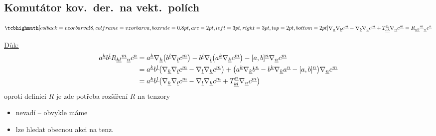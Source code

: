 \subsection*{Komutátor kov.\ der.\ na vekt.\ polích}
\begin{veta}
\[
  \vzorec{\nabla_{\gmIjedenactAu{a}}\nabla_{\gmIjedenactAu{b}}c^{\gmIjedenactAu{m}} - \nabla_{\gmIjedenactAu{b}}\nabla_{\gmIjedenactAu{a}}c^{\gmIjedenactAu{m}}
  + T^{\gmIjedenactAu{n}}_{\gmIjedenactAu{ab}}\nabla_{\gmIjedenactAu{n}}c^{\gmIjedenactAu{m}}
  = R_{\gmIjedenactAu{ab}}{}^{\gmIjedenactAu{m}}{}_{\gmIjedenactAu{n}}c^{\gmIjedenactAu{n}}}
\]
\end{veta}
\underline{Důk:}
\begin{align*}
  a^{\underline{k}}b^{\underline{l}}R_{\underline{kl}}{}^{\underline{m}}{}_{\underline{n}}c^{\underline{n}}
  &= a^{\underline{k}}\nabla_{\underline{k}}\big(b^{\underline{l}}\nabla_{\underline{l}}c^{\underline{m}}\big)
   - b^{\underline{l}}\nabla_{\underline{l}}\big(a^{\underline{k}}\nabla_{\underline{k}}c^{\underline{m}}\big)
   - [a,b]^{\underline{n}}\nabla_{\underline{n}}c^{\underline{m}} \\
  &= a^{\underline{k}}b^{\underline{l}}\big(\nabla_{\underline{k}}\nabla_{\underline{l}}c^{\underline{m}} - \nabla_{\underline{l}}\nabla_{\underline{k}}c^{\underline{m}}\big)
   + \big(a^{\underline{k}}\nabla_{\underline{k}}b^{\underline{n}} - b^{\underline{k}}\nabla_{\underline{k}}a^{\underline{n}} - [a,b]^{\underline{n}}\big)\nabla_{\underline{n}}c^{\underline{m}} \\
  &= a^{\underline{k}}b^{\underline{l}}\big(\nabla_{\underline{k}}\nabla_{\underline{l}}c^{\underline{m}} - \nabla_{\underline{l}}\nabla_{\underline{k}}c^{\underline{m}}
   + T^{\underline{n}}_{\underline{kl}}\nabla_{\underline{n}}c^{\underline{m}}\big)
\end{align*}
oproti definici $R$ je zde potřeba rozšíření $R$ na tenzory
\begin{itemize}[nosep]
  \item[--] nevadí -- obvykle máme
  \item[--] lze hledat obecnou akci na tenz.
\end{itemize}

